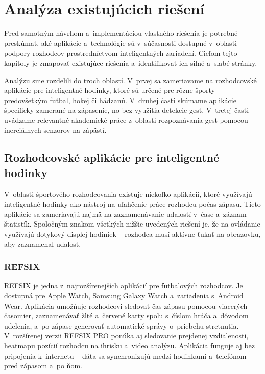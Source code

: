 \section{Analýza existujúcich riešení}

Pred samotným návrhom a~implementáciou vlastného riešenia je
potrebné preskúmať, aké aplikácie a~technológie sú v~súčasnosti
dostupné v~oblasti podpory rozhodcov prostredníctvom inteligentných
zariadení. Cieľom tejto kapitoly je zmapovať existujúce riešenia
a~identifikovať ich silné a~slabé stránky.

Analýzu sme rozdelili do troch oblastí. V~prvej sa zameriavame
na rozhodcovské aplikácie pre inteligentné hodinky, ktoré sú určené
pre rôzne športy -- predovšetkým futbal, hokej či hádzanú.
V~druhej časti skúmame aplikácie špecificky zamerané na
zápasenie, no bez využitia detekcie gest. V~tretej časti
uvádzame relevantné akademické práce z~oblasti rozpoznávania
gest pomocou inerciálnych senzorov na zápästí.

\subsection{Rozhodcovské aplikácie pre inteligentné hodinky}

V~oblasti športového rozhodcovania existuje niekoľko aplikácií,
ktoré využívajú inteligentné hodinky ako nástroj na uľahčenie práce
rozhodcu počas zápasu. Tieto aplikácie sa zameriavajú najmä na
zaznamenávanie udalostí v~čase a~záznam štatistík.
Spoločným znakom všetkých nižšie uvedených riešení je, že na
ovládanie využívajú dotykový displej hodiniek -- rozhodca musí
aktívne ťukať na obrazovku, aby zaznamenal udalosť.

\subsubsection{REFSIX}
REFSIX \cite{refsix} je jedna z~najrozšírenejších aplikácií pre futbalových
rozhodcov. Je dostupná pre Apple Watch, Samsung Galaxy Watch
a~zariadenia s~Android Wear. Aplikácia umožňuje rozhodcovi
sledovať čas zápasu pomocou viacerých časomier, zaznamenávať
žlté a~červené karty spolu s~číslom hráča a~dôvodom udelenia,
a~po zápase generovať automatické správy o~priebehu stretnutia.
V~rozšírenej verzii REFSIX PRO ponúka aj sledovanie prejdenej
vzdialenosti, heatmapu pozícií rozhodcu na ihrisku a~video
analýzu. Aplikácia funguje aj bez pripojenia k~internetu --
dáta sa synchronizujú medzi hodinkami a~telefónom pred zápasom
a~po ňom.


